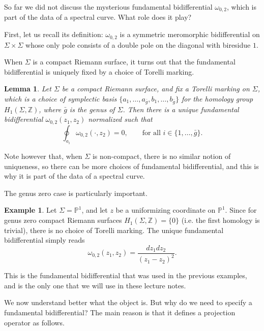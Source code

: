 \documentclass[reqno,oneside,11pt]{amsart}
\theoremstyle{plain}
\newtheorem{lemma}[theorem]{Lemma}
\theoremstyle{definition}
\newtheorem{example}[theorem]{Example}
\theoremstyle{remark}
\numberwithin{equation}{section}
\begin{document}
So far we did not discuss the mysterious fundamental bidifferential $\omega_{0,2}$, which is part of the data of a spectral curve. What role does it play?

First, let us recall its definition: $\omega_{0,2}$ is a symmetric meromorphic bidifferential on $\Sigma \times \Sigma$ whose only pole consists of a double pole on the diagonal with biresidue $1$. 

When $\Sigma$ is a compact Riemann surface, it turns out that the fundamental bidifferential is uniquely fixed by a choice of Torelli marking.

\begin{lemma}\label{l:bergman}
Let $\Sigma$ be a compact Riemann surface, and fix a Torelli marking on $\Sigma$, which is a choice of symplectic basis $\{a_1, \ldots, a_{\bar g}, b_1, \ldots, b_{\bar g} \}$ for the homology group $H_1(\Sigma, \mathbb{Z})$, where $\bar{g}$ is the genus of $\Sigma$. Then there is a unique fundamental bidifferential $\omega_{0,2}(z_1, z_2)$ normalized such that
\begin{equation}
\oint_{a_i} \omega_{0,2}(\cdot, z_2) = 0, \qquad \text{for all $i \in \{1,\ldots,\bar{g} \}$.}
\end{equation}
\end{lemma}

Note however that, when $\Sigma$ is non-compact, there is no similar notion of uniqueness, so there can be more choices of fundamental bidifferential, and this is why it is part of the data of a spectral curve.


The genus zero case is particularly important.

\begin{example}
Let $\Sigma = \mathbb{P}^1$, and let $z$ be a uniformizing coordinate on $\mathbb{P}^1$. Since for genus zero compact Riemann surfaces $H_1(\Sigma,\mathbb{Z}) = \{0\}$ (i.e. the first homology is trivial), there is no choice of  Torelli marking. The unique fundamental bidifferential simply reads
\begin{equation}\label{eq:w02}
\omega_{0,2}(z_1,z_2) = \frac{d z_1 dz_2}{(z_1-z_2)^2}.
\end{equation}
\end{example}
This is the fundamental bidifferential that was used in the previous examples, and is the only one that we will use in these lecture notes. 

We now understand better what the object is. But why do we need to specify a fundamental bidifferential? The main reason is that it defines a projection operator as follows.
\end{document}
